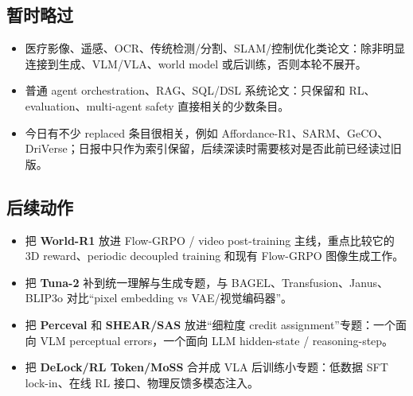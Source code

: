 \subsection{暂时略过}

\begin{itemize}[leftmargin=1.5em]
  \item 医疗影像、遥感、OCR、传统检测/分割、SLAM/控制优化类论文：除非明显连接到生成、VLM/VLA、world model 或后训练，否则本轮不展开。
  \item 普通 agent orchestration、RAG、SQL/DSL 系统论文：只保留和 RL、evaluation、multi-agent safety 直接相关的少数条目。
  \item 今日有不少 replaced 条目很相关，例如 Affordance-R1、SARM、GeCO、DriVerse；日报中只作为索引保留，后续深读时需要核对是否此前已经读过旧版。
\end{itemize}

\subsection{后续动作}

\begin{itemize}[leftmargin=1.5em]
  \item 把 \textbf{World-R1} 放进 Flow-GRPO / video post-training 主线，重点比较它的 3D reward、periodic decoupled training 和现有 Flow-GRPO 图像生成工作。
  \item 把 \textbf{Tuna-2} 补到统一理解与生成专题，与 BAGEL、Transfusion、Janus、BLIP3o 对比“pixel embedding vs VAE/视觉编码器”。
  \item 把 \textbf{Perceval} 和 \textbf{SHEAR/SAS} 放进“细粒度 credit assignment”专题：一个面向 VLM perceptual errors，一个面向 LLM hidden-state / reasoning-step。
  \item 把 \textbf{DeLock/RL Token/MoSS} 合并成 VLA 后训练小专题：低数据 SFT lock-in、在线 RL 接口、物理反馈多模态注入。
\end{itemize}
